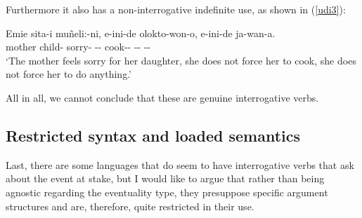\documentclass[output=paper]{langsci/langscibook}
\begin{document}
Furthermore it also has a non-interrogative indefinite use, as shown in
(\ref{udi3}):

\begin{exe}
\ex \label{udi3} 
\sn\gll Emi\ng e sita-i mu\~neli:-ni, e-ini-de olokto-won-o, e-ini-de ja-wan-a.\\
mother child-\Fsg{} sorry-\Tsg{} \Neg{}-\Tsg-\Foc{} cook-\Caus{}-\Ep{}
\Neg{}-\Tsg{}-\Foc{} \Prov-\Caus-\Ep{}\\
\glt `The mother feels sorry for her daughter, she does not force her to cook, she does not force her to do anything.'
\end{exe}

All in all, we cannot conclude that these are genuine interrogative verbs.

\subsection{Restricted syntax and loaded semantics}
\label{loaded}
Last, there are some languages that do seem to have interrogative verbs that
ask about the event at stake, but I would like to argue that rather than being
agnostic regarding the eventuality type, they presuppose specific argument
structures and are, therefore, quite restricted in their use.
\end{document}
